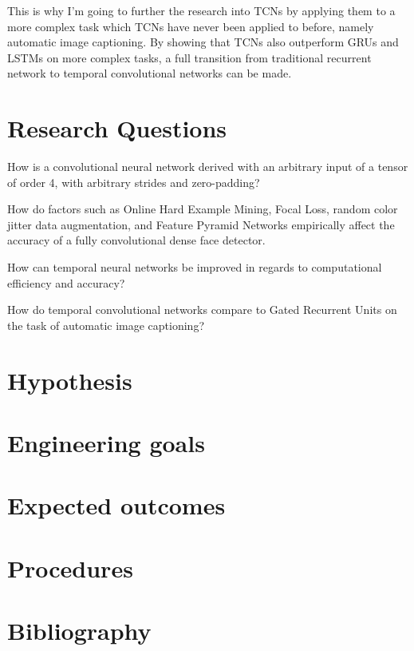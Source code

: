 \documentclass[a4paper, twoside]{article}
\begin{document}
This is why I'm going to further the research into TCNs by applying them to a more complex task which TCNs have never been applied to before, namely automatic image captioning. By showing that TCNs also outperform GRUs and LSTMs on more complex tasks, a full transition from traditional recurrent network to temporal convolutional networks can be made.

\section{Research Questions}
How is a convolutional neural network derived with an arbitrary input of a tensor of order 4, with arbitrary strides and zero-padding?

How do factors such as Online Hard Example Mining, Focal Loss, random color jitter data augmentation, and Feature Pyramid Networks empirically affect the accuracy of a fully convolutional dense face detector.

How can temporal neural networks be improved in regards to computational efficiency and accuracy?

How do temporal convolutional networks compare to Gated Recurrent Units on the task of automatic image captioning?

\section{Hypothesis}

\section{Engineering goals}

\section{Expected outcomes}

\section{Procedures}

\section{Bibliography}
\end{document}
